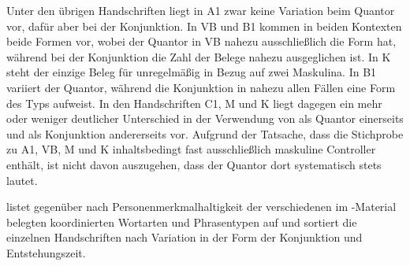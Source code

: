 Unter den übrigen Handschriften liegt in A1 zwar keine Variation
beim Quantor vor, dafür aber bei der Konjunktion. In VB und
B1 kommen in beiden Kontexten beide Formen vor, wobei der Quantor in
VB nahezu ausschließlich die Form  hat, während bei der
Konjunktion die Zahl der Belege nahezu ausgeglichen ist. In K steht
der einzige Beleg für  unregelmäßig in Bezug auf zwei Maskulina.
In B1 variiert der Quantor, während die Konjunktion in nahezu allen
Fällen eine Form des Typs  aufweist. In den Handschriften
C1, M und K liegt dagegen ein mehr oder
weniger deutlicher Unterschied in der Verwendung von  als Quantor
einerseits und  als Konjunktion andererseits vor. Aufgrund der
Tatsache, dass die Stichprobe zu A1, VB, M und
K inhaltsbedingt fast ausschließlich maskuline Controller enthält,
ist nicht davon auszugehen, dass der Quantor dort systematisch stets
 lautet.

 listet  gegenüber  nach
Personenmerkmalhaltigkeit der verschiedenen im \KC{}-Material belegten
koordinierten Wortarten und Phrasentypen auf und sortiert die einzelnen
Handschriften nach Variation in der Form der Konjunktion und Entstehungszeit.

